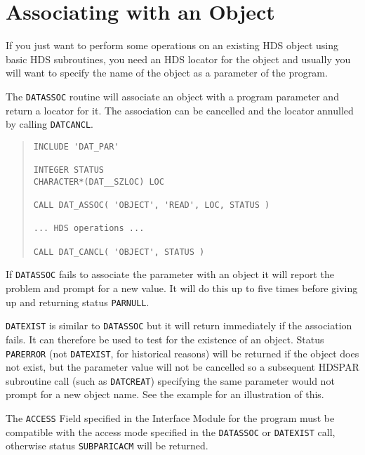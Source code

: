 \documentclass[twoside,11pt]{article}
\newcommand{\htmlref}[2]{#1}
\newcommand{\xref}[3]{#1}
\newcommand{\xlabel}[1]{}
\renewcommand{\_}{\texttt{\symbol{95}}}
\begin{document}
\section{\xlabel{associating_with_an_object}Associating with an Object}
If you just want to perform some operations on an existing
\xref{HDS object}{sun92}{HDS_objects}
using basic HDS subroutines, you need an
\xref{HDS locator}{sun92}{using_locators}
for the object and usually you will want to specify the name of the object as
a parameter of the program.

The
\htmlref{\texttt{DAT\_ASSOC}}{DAT_ASSOC}
routine will associate an object with a program parameter and return a locator
for it.
The association can be cancelled and the locator annulled by calling
\htmlref{\texttt{DAT\_CANCL}}{DAT_CANCL}.

\begin{quote} \begin{verbatim}
INCLUDE 'DAT_PAR'

INTEGER STATUS
CHARACTER*(DAT__SZLOC) LOC

CALL DAT_ASSOC( 'OBJECT', 'READ', LOC, STATUS )

... HDS operations ...

CALL DAT_CANCL( 'OBJECT', STATUS )
\end{verbatim} \end{quote}

If \texttt{DAT\_ASSOC} fails to associate the parameter with an object it
will report the problem and prompt for a new value.
It will do this up to five times before giving up and returning status
\texttt{PAR\_\_NULL}.

\htmlref{\texttt{DAT\_EXIST}}{DAT_EXIST} is similar to \texttt{DAT\_ASSOC}
but it will return immediately if the association fails. It can therefore be
used to test for the existence of an object. Status \texttt{PAR\_\_ERROR}
(not \texttt{DAT\_EXIST}, for historical reasons) will be returned if the
object does not exist, but the parameter value will not be cancelled so
a subsequent HDSPAR subroutine call (such as
\htmlref{\texttt{DAT\_CREAT}}{DAT\_CREAT})
specifying the same parameter would not prompt for a new object name.
See
\htmlref{the example}{example} for an
illustration of this.

The
\xref{\texttt{ACCESS} Field}{sun115}{the_access_field}
specified in the Interface Module for the program must be compatible with
the access mode specified in the
\texttt{DAT\_ASSOC} or \texttt{DAT\_EXIST} call, otherwise status
\texttt{SUBPAR\_ICACM} will be returned.
\end{document}
